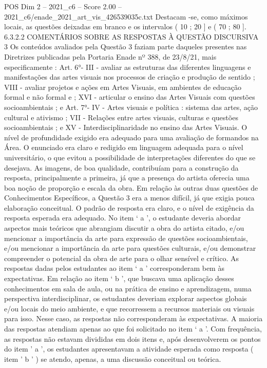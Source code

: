\begin{textsample}{POS Dim 2 – 2021\_c6 – Score 2.00 – 2021\_c6/enade\_2021\_art\_vis\_426539035c.txt}
Destacam -se, como máximos locais, as questões deixadas em branco e os intervalos ( 10 ; 20 ] e ( 70 ; 80 ]. 6.3.2.2 COMENTÁRIOS SOBRE AS RESPOSTAS À QUESTÃO DISCURSIVA 3 Os conteúdos avaliados pela Questão 3 faziam parte daqueles presentes nas Diretrizes publicadas pela Portaria Enade nº 388, de 23/8/21, mais especificamente : Art. 6{\EmojiFont °}- III - avaliar as estruturas das diferentes linguagens e manifestações das artes visuais nos processos de criação e produção de sentido ; VIII - avaliar projetos e ações em Artes Visuais, em ambientes de educação formal e não formal e ; XVI - articular o ensino das Artes Visuais com questões socioambientais ; e Art. 7{\EmojiFont °}- IV - Artes visuais e política : sistema das artes, ação cultural e ativismo ; VII - Relações entre artes visuais, culturas e questões socioambientais ; e XV - Interdisciplinaridade no ensino das Artes Visuais.
O nível de profundidade exigido era adequado para uma avaliação de formandos na Área.
O enunciado era claro e redigido em linguagem adequada para o nível universitário, o que evitou a possibilidade de interpretações diferentes do que se desejava.
As imagens, de boa qualidade, contribuíam para a construção da resposta, principalmente a primeira, já que a presença do artista oferecia uma boa noção de proporção e escala da obra.
Em relação às outras duas questões de Conhecimentos Específicos, a Questão 3 era a menos difícil, já que exigia pouca elaboração conceitual.
O padrão de resposta era claro, e o nível de exigência da resposta esperada era adequado.
No item ‘ a ’, o estudante deveria abordar aspectos mais teóricos que abrangiam discutir a obra do artista citado, e/ou mencionar a importância da arte para expressão de questões socioambientais, e/ou mencionar a importância da arte para questões culturais, e/ou demonstrar compreender o potencial da obra de arte para o olhar sensível e crítico.
As respostas dadas pelos estudantes ao item ‘ a ’ corresponderam bem às expectativas.
Em relação ao item ‘ b ’, que buscava uma aplicação desses conhecimentos em sala de aula, ou na prática de ensino e aprendizagem, numa perspectiva interdisciplinar, os estudantes deveriam explorar aspectos globais e/ou locais do meio ambiente, e que recorressem a recursos materiais ou visuais para isso.
Nesse caso, as respostas não corresponderam às expectativas.
A maioria das respostas atendiam apenas ao que foi solicitado no item ‘ a ’.
Com frequência, as respostas não estavam divididas em dois itens e, após desenvolverem os pontos do item ' a ', os estudantes apresentavam a atividade esperada como resposta ( item ' b ' ) se atendo, apenas, a uma discussão conceitual ou teórica.

\end{textsample}
